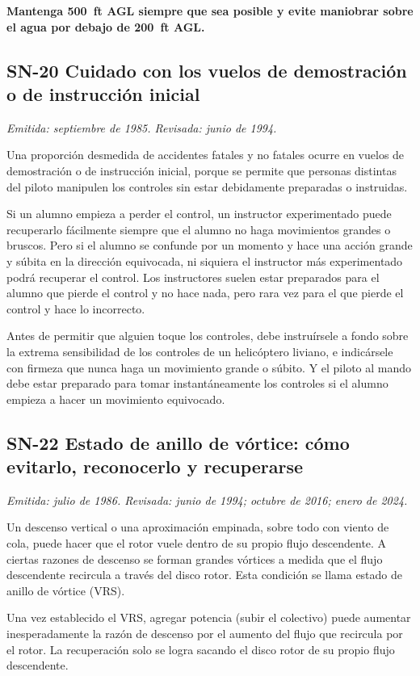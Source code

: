 \textbf{Mantenga 500~ft AGL siempre que sea posible y evite maniobrar sobre el agua por debajo de 200~ft AGL.}

\subsection*{SN-20 \quad Cuidado con los vuelos de demostración o de instrucción inicial}
{\small\textit{Emitida: septiembre de 1985. Revisada: junio de 1994.}}

Una proporción desmedida de accidentes fatales y no fatales ocurre en vuelos de demostración o de instrucción inicial, porque se permite que personas distintas del piloto manipulen los controles sin estar debidamente preparadas o instruidas.

Si un alumno empieza a perder el control, un instructor experimentado puede recuperarlo fácilmente siempre que el alumno no haga movimientos grandes o bruscos. Pero si el alumno se confunde por un momento y hace una acción grande y súbita en la dirección equivocada, ni siquiera el instructor más experimentado podrá recuperar el control. Los instructores suelen estar preparados para el alumno que pierde el control y no hace nada, pero rara vez para el que pierde el control y hace lo incorrecto.

Antes de permitir que alguien toque los controles, debe instruírsele a fondo sobre la extrema sensibilidad de los controles de un helicóptero liviano, e indicársele con firmeza que nunca haga un movimiento grande o súbito. Y el piloto al mando debe estar preparado para tomar instantáneamente los controles si el alumno empieza a hacer un movimiento equivocado.

\subsection*{SN-22 \quad Estado de anillo de vórtice: cómo evitarlo, reconocerlo y recuperarse}
{\small\textit{Emitida: julio de 1986. Revisada: junio de 1994; octubre de 2016; enero de 2024.}}

Un descenso vertical o una aproximación empinada, sobre todo con viento de cola, puede hacer que el rotor vuele dentro de su propio flujo descendente. A ciertas razones de descenso se forman grandes vórtices a medida que el flujo descendente recircula a través del disco rotor. Esta condición se llama estado de anillo de vórtice (VRS).

Una vez establecido el VRS, agregar potencia (subir el colectivo) puede aumentar inesperadamente la razón de descenso por el aumento del flujo que recircula por el rotor. La recuperación solo se logra sacando el disco rotor de su propio flujo descendente.

